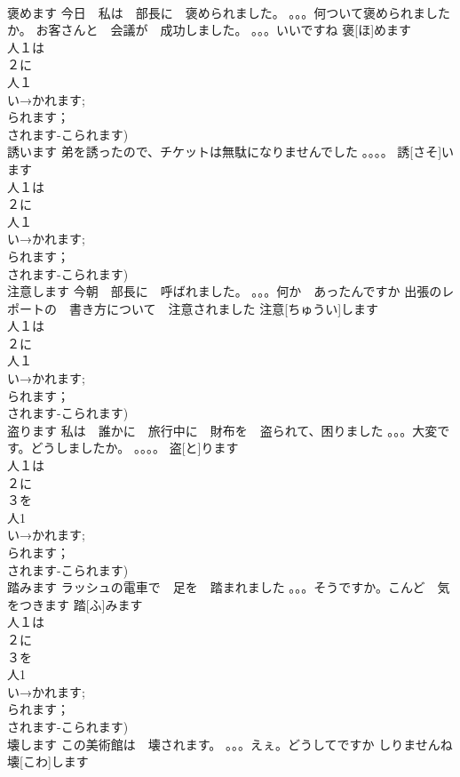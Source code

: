 \documentclass[8pt]{extreport}
\begin{document}
\begin{CJK}{UTF8}{min}
\\	褒めます	今日　私は　部長に　褒められました。 。。。何ついて褒められましたか。 お客さんと　会議が　成功しました。 。。。いいですね	褒[ほ]めます			
\\	人１は
\\	２に
\\	人１
\\	い→かれます;
\\	られます；
\\	されます-こられます)
\\	誘います	弟を誘ったので、チケットは無駄になりませんでした 。。。。	誘[さそ]います			
\\	人１は
\\	２に
\\	人１
\\	い→かれます;
\\	られます；
\\	されます-こられます)
\\	注意します	今朝　部長に　呼ばれました。 。。。何か　あったんですか 出張のレポートの　書き方について　注意されました	注意[ちゅうい]します			
\\	人１は
\\	２に
\\	人１
\\	い→かれます;
\\	られます；
\\	されます-こられます)
\\	盗ります	私は　誰かに　旅行中に　財布を　盗られて、困りました 。。。大変です。どうしましたか。 。。。。	盗[と]ります			
\\	人１は　
\\	２に　
\\	３を　
\\	人1 
\\	い→かれます;
\\	られます；
\\	されます-こられます)
\\	踏みます	ラッシュの電車で　足を　踏まれました 。。。そうですか。こんど　気をつきます	踏[ふ]みます			
\\	人１は　
\\	２に　
\\	３を　
\\	人1 
\\	い→かれます;
\\	られます；
\\	されます-こられます)
\\	壊します	この美術館は　壊されます。 。。。えぇ。どうしてですか しりませんね	壊[こわ]します			

\end{CJK}
\end{document}
